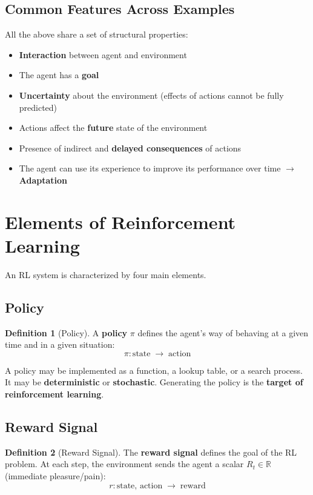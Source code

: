 \documentclass[11pt,a4paper]{article}
\theoremstyle{definition}
\newtheorem{definition}{Definition}[section]
\theoremstyle{plain}
\theoremstyle{remark}
\begin{document}
\subsection{Common Features Across Examples}

All the above share a set of structural properties:
\begin{itemize}
    \item \textbf{Interaction} between agent and environment
    \item The agent has a \textbf{goal}
    \item \textbf{Uncertainty} about the environment (effects of actions cannot be fully predicted)
    \item Actions affect the \textbf{future} state of the environment
    \item Presence of indirect and \textbf{delayed consequences} of actions
    \item The agent can use its experience to improve its performance over time $\to$ \textbf{Adaptation}
\end{itemize}


\section{Elements of Reinforcement Learning}

An RL system is characterized by four main elements.

\subsection{Policy}

\begin{definition}[Policy]
A \textbf{policy} $\pi$ defines the agent's way of behaving at a given time and in a given situation:
\[
    \pi: \text{state} \;\to\; \text{action}
\]
\end{definition}

A policy may be implemented as a function, a lookup table, or a search process. It may be \textbf{deterministic} or \textbf{stochastic}. Generating the policy is the \textbf{target of reinforcement learning}.

\subsection{Reward Signal}

\begin{definition}[Reward Signal]
The \textbf{reward signal} defines the goal of the RL problem. At each step, the environment sends the agent a scalar $R_t \in \mathbb{R}$ (immediate pleasure/pain):
\[
    r: \text{state},\, \text{action} \;\to\; \text{reward}
\]
\end{definition}
\end{document}
